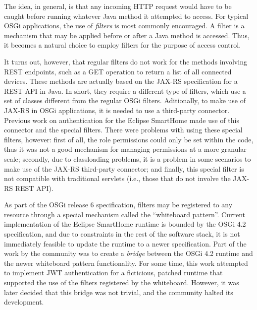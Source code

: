 \documentclass[12pt]{article}
\begin{document}
The idea, in general, is that any incoming HTTP request would have to be caught before running whatever Java method it attempted to access. For typical OSGi applications, the use of \emph{filters} is most commonly encouraged. A filter is a mechanism that may be applied before or after a Java method is accessed. Thus, it becomes a natural choice to employ filters for the purpose of access control.

It turns out, however, that regular filters do not work for the methods involving REST endpoints, such as a GET operation to return a list of all connected devices. These methods are actually based on the JAX-RS specification for a REST API in Java. In short, they require a different type of filters, which use a set of classes different from the regular OSGi filters. Aditionally, to make use of JAX-RS in OSGi applications, it is needed to use a third-party connector. Previous work on authentication for the Eclipse SmartHome made use of this connector and the special filters. There were problems with using these special filters, however: first of all, the role permissions could only be set within the code, thus it was not a good mechanism for managing permissions at a more granular scale; secondly, due to classloading problems, it is a problem in some scenarios to make use of the JAX-RS third-party connector; and finally, this special filter is not compatible with traditional servlets (i.e., those that do not involve the JAX-RS REST API).

As part of the OSGi release 6 specification, filters may be registered to any resource through a special mechanism called the ``whiteboard pattern''. Current implementation of the Eclipse SmartHome runtime is bounded by the OSGi 4.2 specification, and due to constraints in the rest of the software stack, it is not immediately feasible to update the runtime to a newer specification. Part of the work by the community was to create a \emph{bridge} between the OSGi 4.2 runtime and the newer whiteboard pattern functionality. For some time, this work attempted to implement JWT authentication for a ficticious, patched runtime that supported the use of the filters registered by the whiteboard. However, it was later decided that this bridge was not trivial, and the community halted its development.
\end{document}
